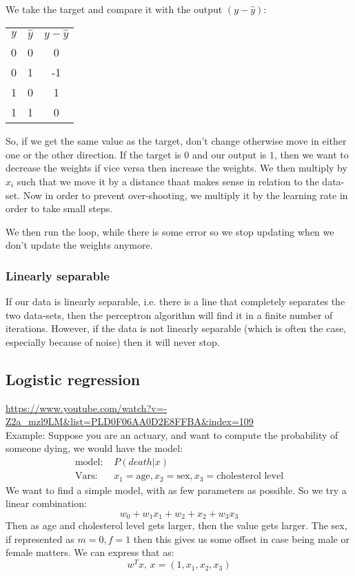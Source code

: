     We take the target and compare it with the output $(y-\hat{y})$:
    \begin{table}
        \centering
        \begin{tabular}{c c c}
            $y$ & $\hat{y}$ & $y-\hat{y}$\\
            0 & 0 & 0\\
            0 & 1 & -1\\
            1 & 0 & 1\\
            1 & 1 & 0
        \end{tabular}
    \end{table}
    So, if we get the same value as the target, don't change otherwise move in 
    either one or the other direction. If the target is $0$ and our output is 
    $1$, then we want to decrease the weights if vice versa then increase the 
    weights. We then multiply by $x_i$ such that we move it by a distance thaat 
    makes sense in relation to the data-set. Now in order to prevent 
    over-shooting, we multiply it by the learning rate in order to take small 
    steps.
    
    We then run the loop, while there is some error so we stop updating when we 
    don't update the weights anymore.
    
    \subsubsection{Linearly separable}
    If our data is linearly separable, i.e. there is a line that completely 
    separates the two data-sets, then the perceptron algorithm will find it in 
    a finite number of iterations. However, if the data is not linearly 
    separable (which is often the case, especially because of noise) then it 
    will never stop.
    
    \subsection{Logistic regression}
    \url{https://www.youtube.com/watch?v=-Z2a_mzl9LM&list=PLD0F06AA0D2E8FFBA&index=109}\\
    Example: Suppose you are an actuary, and want to compute the probability of 
    someone dying, we would have the model:
    \begin{align*}
        \text{model: } &P(death|x)\\
        \text{Vars: } & x_1 = \text{age}, x_2 = \text{sex}, x_3 = 
        \text{cholesterol level}
    \end{align*}
    We want to find a simple model, with as few parameters as possible. So we 
    try a linear combination:
    \begin{equation*}
        w_0+w_1x_1+w_2+x_2+w_3x_3
    \end{equation*}
    Then as age and cholesterol level gets larger, then the value gets larger. 
    The sex, if represented as $m=0, f=1$ then this gives us some offset in 
    case being male or female matters. We can express that as:
    \begin{equation*}
        w^Tx,\, x=(1,x_1,x_2,x_3)
    \end{equation*}
    
